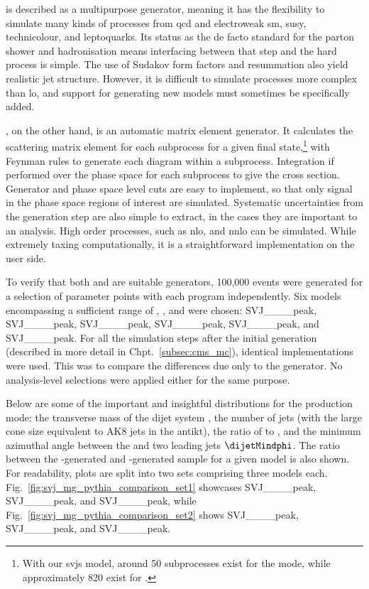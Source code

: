 \PYTHIAEIGHT is described as a multipurpose generator, meaning it has the flexibility to simulate many kinds of processes from \acrshort{qcd} and electroweak \acrshort{sm}, \acrshort{susy}, technicolour, and leptoquarks. Its status as the de facto standard for the parton shower and hadronisation means interfacing between that step and the hard process is simple. The use of Sudakov form factors and resummation also yield realistic jet structure. However, it is difficult to simulate processes more complex than \acrshort{lo}, and support for generating new models must sometimes be specifically added.

\MGvATNLO, on the other hand, is an automatic matrix element generator. It calculates the scattering matrix element for each subprocess for a given final state,\footnote{With our \glspl{svj} model, around 50 subprocesses exist for the \schannel mode, while approximately 820 exist for \tchannel.} with Feynman rules to generate each diagram within a subprocess. Integration if performed over the phase space for each subprocess to give the cross section. Generator and phase space level cuts are easy to implement, so that only signal in the phase space regions of interest are simulated. Systematic uncertainties from the generation step are also simple to extract, in the cases they are important to an analysis. High order processes, such as \acrshort{nlo}, and \acrshort{nnlo} can be simulated. While extremely taxing computationally, it is a straightforward implementation on the user side.

To verify that both \PYTHIA and \MADGRAPH are suitable generators, 100,000 events were generated for a selection of parameter points with each program independently. Six models encompassing a sufficient range of \mZprime, \mDark, and \rinv were chosen: SVJ\_\_\_\_\-peak, SVJ\_\_\_\_peak, SVJ\_\_\_\_\-peak, SVJ\_\_\_\_\-peak, SVJ\_\_\_\_\-peak, and SVJ\_\_\_\_\-peak. For all the simulation steps after the initial generation (described in more detail in Chpt.~\ref{subsec:cms_mc}), identical implementations were used. This was to compare the differences due only to the generator. No analysis-level selections were applied either for the same purpose.

Below are some of the important and insightful distributions for the \schannel production mode: the transverse mass of the dijet system \mT, the number of jets (with the large cone size equivalent to AK8 jets in the \gls{antikt}), the ratio of \MET to \mT, and the minimum azimuthal angle between the \MET and two leading \glspl{jet} $\dijetMindphi$. The ratio between the \MADGRAPH-generated and \PYTHIA-generated sample for a given model is also shown. For readability, plots are split into two sets comprising three models each. Fig.~\ref{fig:svj_mg_pythia_comparison_set1} showcases SVJ\_\_\_\_\-peak, SVJ\_\_\_\_\-peak, and SVJ\_\_\_\_\-peak, while Fig.~\ref{fig:svj_mg_pythia_comparison_set2} shows SVJ\_\_\_\_\-peak, SVJ\_\_\_\_\-peak, and SVJ\_\_\_\_\-peak.

